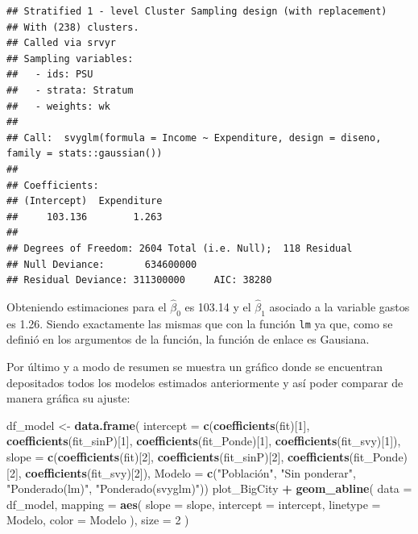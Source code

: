\documentclass[
  12pt,
]{book}
\newenvironment{Shaded}{\begin{snugshade}}{\end{snugshade}}
\newcommand{\AttributeTok}[1]{\textcolor[rgb]{0.13,0.29,0.53}{#1}}
\newcommand{\DecValTok}[1]{\textcolor[rgb]{0.00,0.00,0.81}{#1}}
\newcommand{\FunctionTok}[1]{\textcolor[rgb]{0.13,0.29,0.53}{\textbf{#1}}}
\newcommand{\NormalTok}[1]{#1}
\newcommand{\OtherTok}[1]{\textcolor[rgb]{0.56,0.35,0.01}{#1}}
\newcommand{\SpecialCharTok}[1]{\textcolor[rgb]{0.81,0.36,0.00}{\textbf{#1}}}
\newcommand{\StringTok}[1]{\textcolor[rgb]{0.31,0.60,0.02}{#1}}
\begin{document}
\begin{verbatim}
## Stratified 1 - level Cluster Sampling design (with replacement)
## With (238) clusters.
## Called via srvyr
## Sampling variables:
##   - ids: PSU 
##   - strata: Stratum 
##   - weights: wk 
## 
## Call:  svyglm(formula = Income ~ Expenditure, design = diseno, family = stats::gaussian())
## 
## Coefficients:
## (Intercept)  Expenditure  
##     103.136        1.263  
## 
## Degrees of Freedom: 2604 Total (i.e. Null);  118 Residual
## Null Deviance:       634600000 
## Residual Deviance: 311300000     AIC: 38280
\end{verbatim}

Obteniendo estimaciones para el \(\hat{\beta}_{0}\) es 103.14 y el \(\hat{\beta}_{1}\) asociado a la variable gastos es 1.26. Siendo exactamente las mismas que con la función \texttt{lm} ya que, como se definió en los argumentos de la función, la función de enlace es Gausiana.

Por último y a modo de resumen se muestra un gráfico donde se encuentran depositados todos los modelos estimados anteriormente y así poder comparar de manera gráfica su ajuste:

\begin{Shaded}
\begin{Highlighting}[]
\NormalTok{df\_model }\OtherTok{\textless{}{-}} \FunctionTok{data.frame}\NormalTok{(}
  \AttributeTok{intercept =} \FunctionTok{c}\NormalTok{(}\FunctionTok{coefficients}\NormalTok{(fit)[}\DecValTok{1}\NormalTok{],}
               \FunctionTok{coefficients}\NormalTok{(fit\_sinP)[}\DecValTok{1}\NormalTok{],}
               \FunctionTok{coefficients}\NormalTok{(fit\_Ponde)[}\DecValTok{1}\NormalTok{],}
               \FunctionTok{coefficients}\NormalTok{(fit\_svy)[}\DecValTok{1}\NormalTok{]),}
  \AttributeTok{slope =} \FunctionTok{c}\NormalTok{(}\FunctionTok{coefficients}\NormalTok{(fit)[}\DecValTok{2}\NormalTok{],}
               \FunctionTok{coefficients}\NormalTok{(fit\_sinP)[}\DecValTok{2}\NormalTok{],}
               \FunctionTok{coefficients}\NormalTok{(fit\_Ponde)[}\DecValTok{2}\NormalTok{],}
               \FunctionTok{coefficients}\NormalTok{(fit\_svy)[}\DecValTok{2}\NormalTok{]),}
  \AttributeTok{Modelo =} \FunctionTok{c}\NormalTok{(}\StringTok{"Población"}\NormalTok{, }\StringTok{"Sin ponderar"}\NormalTok{,}
             \StringTok{"Ponderado(lm)"}\NormalTok{, }\StringTok{"Ponderado(svyglm)"}\NormalTok{))}
\NormalTok{plot\_BigCity }\SpecialCharTok{+}  \FunctionTok{geom\_abline}\NormalTok{( }\AttributeTok{data =}\NormalTok{ df\_model,}
    \AttributeTok{mapping =} \FunctionTok{aes}\NormalTok{( }\AttributeTok{slope =}\NormalTok{ slope,}
      \AttributeTok{intercept =}\NormalTok{ intercept, }\AttributeTok{linetype =}\NormalTok{ Modelo,}
      \AttributeTok{color =}\NormalTok{ Modelo ), }\AttributeTok{size =} \DecValTok{2}
\NormalTok{  )}
\end{Highlighting}
\end{Shaded}
\end{document}
